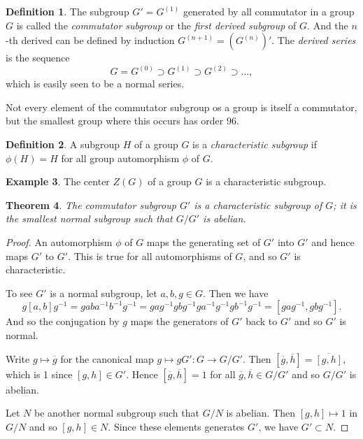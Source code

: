 \documentclass[12pt]{report}
\newtheorem{theorem}{Theorem}[section]
\theoremstyle{definition}
\newtheorem{definition}[theorem]{Definition}
\newtheorem{example}[theorem]{Example}
\begin{document}
\begin{definition}
	The subgroup $G'=G^{(1)}$ generated by all commutator in a group $G$ is called the \emph{commutator subgroup} or the \emph{first derived subgroup} of $G$. And the $n$-th derived can be defined by induction $G^{(n+1)}=(G^{(n)})'$. The \emph{derived series} is the sequence $$G=G^{(0)}\supset G^{(1)}\supset G^{(2)}\supset \dots,$$
	which is easily seen to be a normal series.
\end{definition}

\begin{remark}
	Not every element of the commutator subgroup os a group is itself a commutator, but the smallest group where this occurs has order 96.
\end{remark}

\begin{definition}
	A subgroup $H$ of a group $G$ is a \emph{characteristic subgroup} if $\phi(H)=H$ for all group automorphism $\phi$ of $G$.
\end{definition}

\begin{example}
	The center $Z(G)$ of a group $G$ is a characteristic subgroup.
\end{example}

\begin{theorem}
	The commutator subgroup $G'$ is a characteristic subgroup of $G$; it is the smallest normal subgroup such that $G/G'$ is abelian.
\end{theorem}

\begin{proof}
	An automorphism $\phi$ of $G$ maps the generating set of $G'$ into $G'$ and hence maps $G'$ to $G'$. This is true for all automorphisms of $G$, and so $G'$ is characteristic.

	To see $G'$ is a normal subgroup, let $a,b,g\in G$. Then we have
	\[g[a,b]g^{-1}=g a b a^{-1}b^{-1}g^{-1} = g a g^{-1} gbg^{-1} ga^{-1}g^{-1}gb^{-1}g^{-1} = [gag^{-1},gbg^{-1}].\]
	And so the conjugation by $g$ maps the generators of $G'$ back to $G'$ and so $G'$ is normal.

	Write $g\mapsto \overline{g}$ for the canonical map $g\mapsto gG': G\to G/G'$. Then $[\overline{g},\overline{h}]=\overline{[g,h]}$, which is 1 since $[g,h]\in G'$. Hence $[\overline{g},\overline{h}]=1$ for all $\overline{g},\overline{h}\in G/G'$ and so $G/G'$ is abelian.

	Let $N$ be another normal subgroup such that $G/N$ is abelian. Then $[g,h]\mapsto 1$ in $G/N$ and so $[g,h]\in N$. Since these elements generates $G'$, we have $G'\subset N$.
\end{proof}
\end{document}
